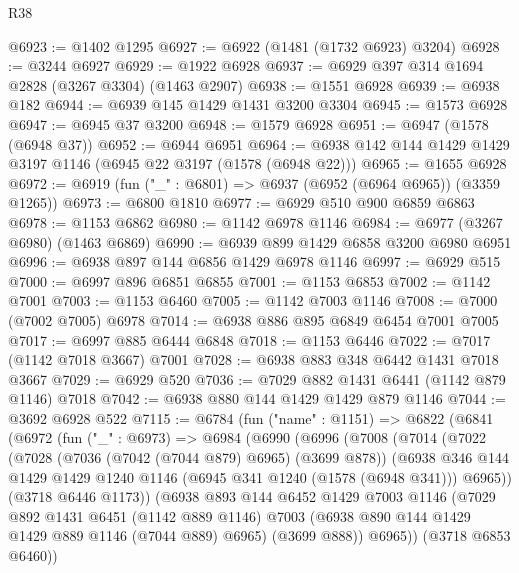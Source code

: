 \begin{lexlean}{R38}
\begin{coremodule}
@6923 := @1402 @1295
@6927 := @6922 (@1481 (@1732 @6923) @3204)
@6928 := @3244 @6927
@6929 := @1922 @6928
@6937 := @6929 @397 @314 @1694 @2828 (@3267 @3304) (@1463 @2907)
@6938 := @1551 @6928
@6939 := @6938 @182
@6944 := @6939 @145 @1429 @1431 @3200 @3304
@6945 := @1573 @6928
@6947 := @6945 @37 @3200
@6948 := @1579 @6928
@6951 := @6947 (@1578 (@6948 @37))
@6952 := @6944 @6951
@6964 := @6938 @142 @144 @1429 @1429 @3197 @1146 (@6945 @22 @3197 (@1578 (@6948 @22)))
@6965 := @1655 @6928
@6972 := @6919 (fun ("_" : @6801) => @6937 (@6952 (@6964 @6965)) (@3359 @1265))
@6973 := @6800 @1810
@6977 := @6929 @510 @900 @6859 @6863
@6978 := @1153 @6862
@6980 := @1142 @6978 @1146
@6984 := @6977 (@3267 @6980) (@1463 @6869)
@6990 := @6939 @899 @1429 @6858 @3200 @6980 @6951
@6996 := @6938 @897 @144 @6856 @1429 @6978 @1146
@6997 := @6929 @515
@7000 := @6997 @896 @6851 @6855
@7001 := @1153 @6853
@7002 := @1142 @7001
@7003 := @1153 @6460
@7005 := @1142 @7003 @1146
@7008 := @7000 (@7002 @7005) @6978
@7014 := @6938 @886 @895 @6849 @6454 @7001 @7005
@7017 := @6997 @885 @6444 @6848
@7018 := @1153 @6446
@7022 := @7017 (@1142 @7018 @3667) @7001
@7028 := @6938 @883 @348 @6442 @1431 @7018 @3667
@7029 := @6929 @520
@7036 := @7029 @882 @1431 @6441 (@1142 @879 @1146) @7018
@7042 := @6938 @880 @144 @1429 @1429 @879 @1146
@7044 := @3692 @6928 @522
@7115 := @6784
    (fun ("name" : @1151) =>
    @6822
      (@6841
        (@6972
          (fun ("_" : @6973) =>
          @6984
            (@6990
              (@6996
                (@7008
                  (@7014
                    (@7022
                      (@7028
                        (@7036 (@7042 (@7044 @879) @6965) (@3699 @878))
                        (@6938
                          @346
                          @144
                          @1429
                          @1429
                          @1240
                          @1146
                          (@6945 @341 @1240 (@1578 (@6948 @341)))
                          @6965))
                      (@3718 @6446 @1173))
                    (@6938
                      @893
                      @144
                      @6452
                      @1429
                      @7003
                      @1146
                      (@7029
                        @892
                        @1431
                        @6451
                        (@1142 @889 @1146)
                        @7003
                        (@6938 @890 @144 @1429 @1429 @889 @1146 (@7044 @889) @6965)
                        (@3699 @888))
                      @6965))
                  (@3718 @6853 @6460))

\end{coremodule}
\end{lexlean}
